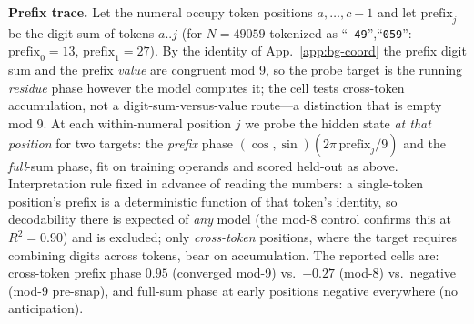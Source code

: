 \documentclass{article} %
\begin{document}
\textbf{Prefix trace.} Let the numeral occupy token positions $a, \dots, c{-}1$ and let $\mathrm{prefix}_j$ be the digit sum of tokens $a..j$ (for $N = 49059$ tokenized as ``\texttt{ 49}'',``\texttt{059}'': $\mathrm{prefix}_0 = 13$, $\mathrm{prefix}_1 = 27$). By the identity of App.~\ref{app:bg-coord} the prefix digit sum and the prefix \emph{value} are congruent mod 9, so the probe target is the running \emph{residue} phase however the model computes it; the cell tests cross-token accumulation, not a digit-sum-versus-value route---a distinction that is empty mod 9. At each within-numeral position $j$ we probe the hidden state \emph{at that position} for two targets: the \emph{prefix} phase $(\cos,\sin)(2\pi\,\mathrm{prefix}_j/9)$ and the \emph{full}-sum phase, fit on training operands and scored held-out as above. Interpretation rule fixed in advance of reading the numbers: a single-token position's prefix is a deterministic function of that token's identity, so decodability there is expected of \emph{any} model (the mod-8 control confirms this at $R^2 = 0.90$) and is excluded; only \emph{cross-token} positions, where the target requires combining digits across tokens, bear on accumulation. The reported cells are: cross-token prefix phase $0.95$ (converged mod-9) vs.\ $-0.27$ (mod-8) vs.\ negative (mod-9 pre-snap), and full-sum phase at early positions negative everywhere (no anticipation).
\end{document}
